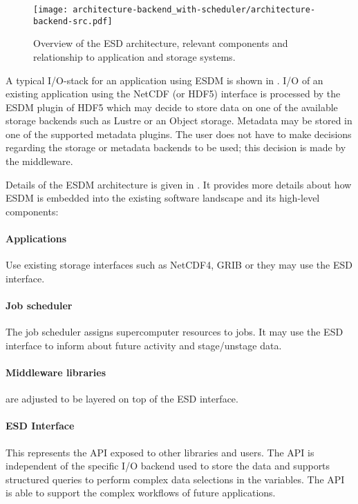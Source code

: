 \begin{figure}[bp]
	\centering
	\texttt{[image: architecture-backend\_with-scheduler/architecture-backend-src.pdf]}
	\caption{Overview of the ESD architecture, relevant components and relationship to application and storage systems.}
	\label{fig:architecture}
\end{figure}

A typical I/O-stack for an application using ESDM is shown in .
I/O of an existing application using the NetCDF (or HDF5) interface is processed by the ESDM plugin of HDF5 which may decide to store data on one of the available
storage backends such as Lustre or an Object storage.
Metadata may be stored in one of the supported metadata plugins.
The user does not have to make decisions regarding the storage or metadata backends to be used; this decision is made by the middleware.

\bigskip


Details of the ESDM architecture is given in .
It provides more details about how ESDM is embedded into the existing software landscape and its high-level components:

\paragraph{Applications}
Use existing storage interfaces such as NetCDF4, GRIB or they may use the ESD interface.

\paragraph{Job scheduler}
The job scheduler assigns supercomputer resources to jobs.
It may use the ESD interface to inform about future activity and stage/unstage data.


\paragraph{Middleware libraries} are adjusted to be layered on top of the ESD interface.


\paragraph{ESD Interface}
This represents the API exposed to other libraries and users.
The API is independent of the specific I/O backend used to store the data and supports structured queries to perform complex data selections in the variables.
The API is able to support the complex workflows of future applications.


